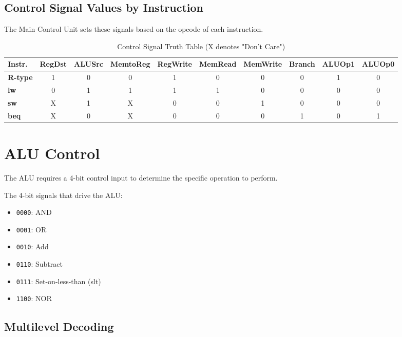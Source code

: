 \subsection{Control Signal Values by Instruction}

The Main Control Unit sets these signals based on the opcode of each instruction.

\begin{table}[h]
\centering
\begin{tabular}{l c c c c c c c c c}
\toprule
\textbf{Instr.} & \textbf{RegDst} & \textbf{ALUSrc} & \textbf{MemtoReg} & \textbf{RegWrite} & \textbf{MemRead} & \textbf{MemWrite} & \textbf{Branch} & \textbf{ALUOp1} & \textbf{ALUOp0} \\
\midrule
\textbf{R-type} & 1 & 0 & 0 & 1 & 0 & 0 & 0 & 1 & 0 \\
\textbf{lw} & 0 & 1 & 1 & 1 & 1 & 0 & 0 & 0 & 0 \\
\textbf{sw} & X & 1 & X & 0 & 0 & 1 & 0 & 0 & 0 \\
\textbf{beq} & X & 0 & X & 0 & 0 & 0 & 1 & 0 & 1 \\
\bottomrule
\end{tabular}
\caption{Control Signal Truth Table (X denotes "Don't Care")}
\end{table}

\section{ALU Control}

The ALU requires a 4-bit control input to determine the specific operation to perform.

\begin{vocabulary}
The 4-bit signals that drive the ALU:
\begin{itemize}
    \item \texttt{0000}: AND
    \item \texttt{0001}: OR
    \item \texttt{0010}: Add
    \item \texttt{0110}: Subtract
    \item \texttt{0111}: Set-on-less-than (slt)
    \item \texttt{1100}: NOR
\end{itemize}
\end{vocabulary}

\subsection{Multilevel Decoding}

